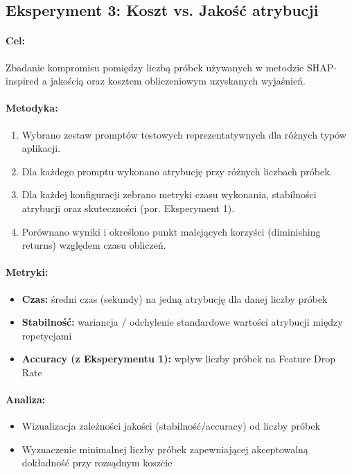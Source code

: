 \documentclass[12pt,a4paper]{article}
\begin{document}
\subsection{Eksperyment 3: Koszt vs. Jakość atrybucji}

\paragraph{Cel:} Zbadanie kompromisu pomiędzy liczbą próbek używanych w metodzie SHAP-inspired a jakością oraz kosztem obliczeniowym uzyskanych wyjaśnień.

\paragraph{Metodyka:}
\begin{enumerate}
    \item Wybrano zestaw promptów testowych reprezentatywnych dla różnych typów aplikacji.
    \item Dla każdego promptu wykonano atrybucję przy różnych liczbach próbek.
    \item Dla każdej konfiguracji zebrano metryki czasu wykonania, stabilności atrybucji oraz skuteczności (por. Eksperyment 1).
    \item Porównano wyniki i określono punkt malejących korzyści (diminishing returns) względem czasu obliczeń.
\end{enumerate}

\paragraph{Metryki:}
\begin{itemize}
    \item \textbf{Czas:} średni czas (sekundy) na jedną atrybucję dla danej liczby próbek
    \item \textbf{Stabilność:} wariancja / odchylenie standardowe wartości atrybucji między repetycjami
    \item \textbf{Accuracy (z Eksperymentu 1):} wpływ liczby próbek na Feature Drop Rate
\end{itemize}

\paragraph{Analiza:}
\begin{itemize}
    \item Wizualizacja zależności jakości (stabilność/accuracy) od liczby próbek
    \item Wyznaczenie minimalnej liczby próbek zapewniającej akceptowalną dokładność przy rozsądnym koszcie
\end{itemize}
\end{document}
